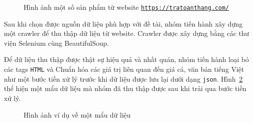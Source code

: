 \documentclass{article}
\numberwithin{equation}{section}
\numberwithin{equation}{section}
\begin{document}
\begin{figure}[!ht]
    \centering
    \caption{Hình ảnh một số sản phẩm từ website \texttt{\url{https://tratoanthang.com/}}}
    \label{fig:website-products}
\end{figure}

Sau khi chọn được nguồn dữ liệu phù hợp với đề tài, nhóm tiến hành xây dựng một crawler để thu thập dữ liệu từ website. Crawler được xây dựng bằng các thư viện Selenium cùng BeautifulSoup. 

Để dữ liệu thu thập được thật sự hiệu quả và nhất quán, nhóm tiến hành loại bỏ các tags \texttt{HTML} và Chuẩn hóa các giá trị liên quan đến giá cả, văn bản tiếng Việt như một bước tiền xử lý trước khi dữ liệu được lưu lại dưới dạng \texttt{json}. Hình~\ref{fig:data-example} thể hiện một mẩu dữ liệu mà nhóm đã thu thập được sau khi trải qua bước tiền xử lý.

\begin{figure}[!ht]
    \centering
    \caption{Hình ảnh ví dụ về một mẩu dữ liệu}
    \label{fig:data-example}
\end{figure}
\end{document}
